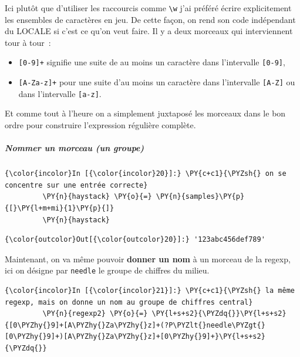     Ici plutôt que d'utiliser les raccourcis comme
\texttt{\textbackslash{}w} j'ai préféré écrire explicitement les
ensembles de caractères en jeu. De cette façon, on rend son code
indépendant du LOCALE si c'est ce qu'on veut faire. Il y a deux morceaux
qui interviennent tour à tour~:

\begin{itemize}
	\item 
	\texttt{{[}0-9{]}+} signifie une suite
	de au moins un caractère dans l'intervalle \texttt{{[}0-9{]}},
	\item	
	\texttt{{[}A-Za-z{]}+} pour une suite d'au moins un caractère dans
	l'intervalle \texttt{{[}A-Z{]}} ou dans l'intervalle \texttt{{[}a-z{]}}.
\end{itemize}

Et comme tout à l'heure on a simplement juxtaposé les morceaux dans le
bon ordre pour construire l'expression régulière complète.

    \hypertarget{nommer-un-morceau-un-groupe}{%
\subparagraph{Nommer un morceau (un
groupe)}\label{nommer-un-morceau-un-groupe}}

    \begin{Verbatim}[commandchars=\\\{\}]
{\color{incolor}In [{\color{incolor}20}]:} \PY{c+c1}{\PYZsh{} on se concentre sur une entrée correcte}
         \PY{n}{haystack} \PY{o}{=} \PY{n}{samples}\PY{p}{[}\PY{l+m+mi}{1}\PY{p}{]}
         \PY{n}{haystack}
\end{Verbatim}


\begin{Verbatim}[commandchars=\\\{\}]
{\color{outcolor}Out[{\color{outcolor}20}]:} '123abc456def789'
\end{Verbatim}
            
    Maintenant, on va même pouvoir \textbf{donner un nom} à un morceau de la
regexp, ici on désigne par \texttt{needle} le groupe de chiffres du
milieu.

    \begin{Verbatim}[commandchars=\\\{\}]
{\color{incolor}In [{\color{incolor}21}]:} \PY{c+c1}{\PYZsh{} la même regexp, mais on donne un nom au groupe de chiffres central}
         \PY{n}{regexp2} \PY{o}{=} \PY{l+s+s2}{\PYZdq{}}\PY{l+s+s2}{[0\PYZhy{}9]+[A\PYZhy{}Za\PYZhy{}z]+(?P\PYZlt{}needle\PYZgt{}[0\PYZhy{}9]+)[A\PYZhy{}Za\PYZhy{}z]+[0\PYZhy{}9]+}\PY{l+s+s2}{\PYZdq{}}
\end{Verbatim}


